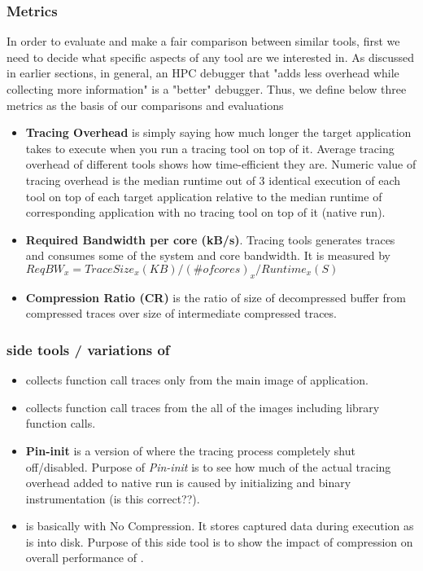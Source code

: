 \subsubsection{Metrics}
In order to evaluate and make a fair comparison between similar tools, first we need to decide what specific aspects of any tool are we interested in. As discussed in earlier sections, in general, an HPC debugger that "adds less overhead while collecting more information" is a "better" debugger. Thus, we define below three metrics as the basis of our comparisons and evaluations
\begin{itemize}
\item \textbf{Tracing Overhead} is simply saying how much longer the target application takes to execute when you run a tracing tool on top of it. Average tracing overhead of different tools shows how time-efficient they are. Numeric value of tracing overhead is the median runtime out of 3 identical execution of each tool on top of each target application relative to the median runtime of corresponding application with no tracing tool on top of it (native run). 
\item  \textbf{Required Bandwidth per core (kB/s)}. Tracing tools generates traces and consumes some of the system and core bandwidth. It is measured by $ReqBW_x = TraceSize_x (KB) / (\# of cores)_x / Runtime_x (S)$
\item \textbf{Compression Ratio (CR)} is the ratio of size of decompressed buffer from compressed traces over size of intermediate compressed traces.
\end{itemize}



\subsubsection{\parlot side tools / variations of \parlot}


\begin{itemize}
\item \textbf{\parlotm} collects function call traces only from the main image of application. 
\item \textbf{\parlota} collects function call traces from the all of the images including library function calls.
\item \textbf{Pin-init} is a version of \parlot where the tracing process completely shut off/disabled. Purpose of \textit{Pin-init} is to see how much of the actual tracing overhead added to native run is caused by initializing \pin and binary instrumentation (is this correct??).
\item \textbf{\parlotnc} is basically \parlot with No Compression. It stores captured data during execution as is into disk. Purpose of this side tool is to show the impact of compression on overall performance of \parlot.
\end{itemize}

